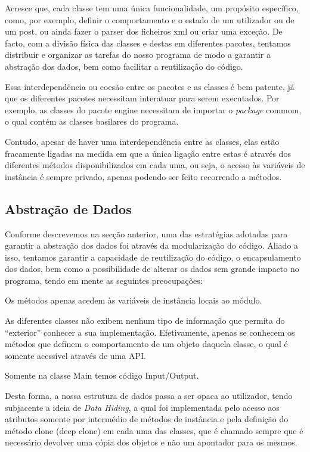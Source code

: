 \documentclass[a4paper]{article}
\begin{document}
Acresce que, cada classe tem uma única funcionalidade, um propósito específico,
como, por exemplo, definir o comportamento e o estado de um utilizador ou de um
post, ou ainda fazer o parser dos ficheiros xml ou criar uma exceção.
De facto, com a divisão física das classes e destas em diferentes pacotes, tentamos
distribuir e organizar as tarefas do nosso programa de modo a garantir a
abstração dos dados, bem como facilitar a reutilização do código.

Essa interdependência ou coesão entre os pacotes e as classes é bem patente, já que
os diferentes pacotes necessitam interatuar para serem executados. Por exemplo,
as classes do pacote engine necessitam de importar o \textit{package} commom, o
qual contém as classes basilares do programa.


Contudo, apesar de haver uma interdependência entre as classes, elas estão
fracamente ligadas na medida em que a única ligação entre estas é através dos
diferentes métodos disponibilizados em cada uma, ou seja, o acesso às variáveis de
instância é sempre privado, apenas podendo ser feito recorrendo a métodos.






\subsection{Abstração de Dados}
\label{sec:abstracao}

Conforme descrevemos na secção anterior, uma das estratégias adotadas para garantir
a abstração dos dados foi através da modularização do código.
Aliado a isso, tentamos garantir a capacidade de reutilização do código, o encapsulamento
dos dados, bem como a possibilidade de alterar os dados sem grande impacto no programa,
tendo em mente as seguintes preocupações:
\begin{itemize}
\begin{item} Os métodos apenas acedem às variáveis de instância locais ao módulo.\end{item}
\begin{item} As diferentes classes não exibem nenhum tipo de informação que permita
do ``exterior'' conhecer a sua implementação. Efetivamente, apenas se conhecem os
métodos que definem o comportamento de um objeto daquela classe, o qual é somente
acessível através de uma API.\end{item}
\begin{item} Somente na classe Main temos código Input/Output.\end{item}
\end{itemize}
Desta forma, a nossa estrutura de dados passa a ser opaca ao utilizador, tendo
subjacente a ideia de \textit{Data Hiding}, a qual foi implementada pelo acesso
aos atributos somente por intermédio de métodos de instância e pela definição do
método clone (deep clone) em cada uma das classes, que é chamado sempre que é
necessário devolver uma cópia dos objetos e não um apontador para os mesmos.
\end{document}
